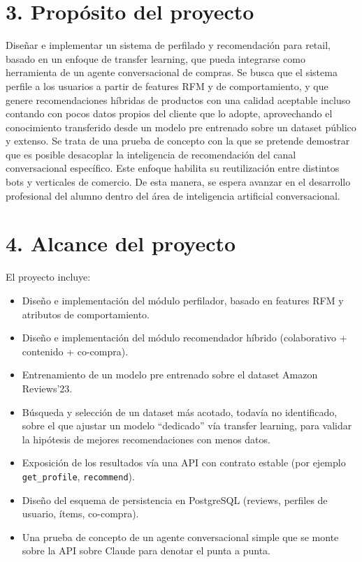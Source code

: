\documentclass[
11pt, %
]{charter}
\begin{document}
\section{3. Propósito del proyecto}
\label{sec:proposito}

Diseñar e implementar un sistema de perfilado y recomendación para retail, basado en un enfoque de transfer learning, que pueda integrarse como herramienta de un agente conversacional de compras. Se busca que el sistema perfile a los usuarios a partir de features RFM y de comportamiento, y que genere recomendaciones híbridas de productos con una calidad aceptable incluso contando con pocos datos propios del cliente que lo adopte, aprovechando el conocimiento transferido desde un modelo pre entrenado sobre un dataset público y extenso. Se trata de una prueba de concepto con la que se pretende demostrar que es posible desacoplar la inteligencia de recomendación del canal conversacional específico. Este enfoque habilita su reutilización entre distintos bots y verticales de comercio. De esta manera, se espera avanzar en el desarrollo profesional del alumno dentro del área de inteligencia artificial conversacional.

\section{4. Alcance del proyecto}
\label{sec:alcance}

El proyecto incluye:
\begin{itemize}
	\item Diseño e implementación del módulo perfilador, basado en features RFM y atributos de comportamiento.
	\item Diseño e implementación del módulo recomendador híbrido (colaborativo + contenido + co-compra).
	\item Entrenamiento de un modelo pre entrenado sobre el dataset Amazon Reviews'23.
	\item Búsqueda y selección de un dataset más acotado, todavía no identificado, sobre el que ajustar un modelo ``dedicado'' vía transfer learning, para validar la hipótesis de mejores recomendaciones con menos datos.
	\item Exposición de los resultados vía una API con contrato estable (por ejemplo \texttt{get\_profile}, \texttt{recommend}).
	\item Diseño del esquema de persistencia en PostgreSQL (reviews, perfiles de usuario, ítems, co-compra).
	\item Una prueba de concepto de un agente conversacional simple que se monte sobre la API sobre Claude para denotar el punta a punta.
\end{itemize}
\end{document}
